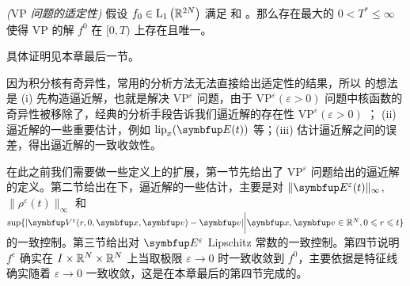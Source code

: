 \begin{theorem}\textit{($\text{VP}$ 问题的适定性)}
    \label{thm:local-wellposedness}
    假设 $f_{0} \in \mathrm{L}_{1}\left({\mathbb{R}}^{2 N}\right)$ 满足 \supremumf 和 \lipOffVsphere。那么存在最大的 $0<T^*\leqslant\infty$ 使得 $\text{VP}$ 的解 $ f^{0}$ 在 $[0,T)$ 上存在且唯一。
    
    具体证明见本章最后一节。




\end{theorem}




因为积分核有奇异性，常用的分析方法无法直接给出适定性的结果，所以 \cite{HorstClasssicalI} 的想法是 (i) 先构造逼近解，也就是解决 $\text{VP}^\varepsilon$ 问题，由于 $\text{VP}^\varepsilon (\varepsilon >0)$ 问题中核函数的奇异性被移除了，经典的分析手段告诉我们逼近解的存在性 $\text{VP}^\varepsilon (\varepsilon >0)$ ； (ii) 逼近解的一些重要估计，例如 $\operatorname{lip}_x (\vE(t))$ 等；(iii) 估计逼近解之间的误差，得出逼近解的一致收敛性。

在此之前我们需要做一些定义上的扩展，第一节先给出了 $\text{VP}^\varepsilon$ 问题给出的逼近解的定义。第二节给出在\supremumf 下，逼近解的一些估计，主要是对 $\|\vE^\varepsilon(t)\|_\infty$, $\|\rho^\varepsilon(t)\|_\infty$ 和 $\sup \{|\vect{V}^\varepsilon(r,0,\vx,\vv)-\vv| \bigg|\vx,\vv \in \bbR^N, 0\leqslant r \leqslant t \}$ 的一致控制。第三节给出对 $\vE^\varepsilon$ Lipschitz 常数的一致控制。第四节说明 $f^\varepsilon$ 确实在 $I\times {\mathbb{R}}^N \times {\mathbb{R}}^N $ 上当取极限 $\varepsilon\rightarrow 0 $ 时一致收敛到 $f^0$，主要依据是特征线确实随着 $\varepsilon\rightarrow 0$ 一致收敛，这是在本章最后的第四节完成的。




